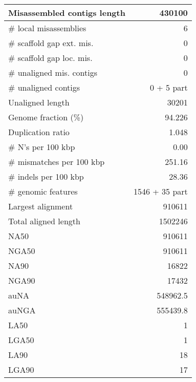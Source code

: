 \documentclass[12pt,a4paper]{article}
\begin{document}
\begin{table}[ht]
\begin{center}
\begin{tabular}{|l*{1}{|r}|}
Misassembled contigs length & 430100 \\ \hline
\# local misassemblies & 6 \\ \hline
\# scaffold gap ext. mis. & 0 \\ \hline
\# scaffold gap loc. mis. & 0 \\ \hline
\# unaligned mis. contigs & 0 \\ \hline
\# unaligned contigs & 0 + 5 part \\ \hline
Unaligned length & 30201 \\ \hline
Genome fraction (\%) & 94.226 \\ \hline
Duplication ratio & 1.048 \\ \hline
\# N's per 100 kbp & 0.00 \\ \hline
\# mismatches per 100 kbp & 251.16 \\ \hline
\# indels per 100 kbp & 28.36 \\ \hline
\# genomic features & 1546 + 35 part \\ \hline
Largest alignment & 910611 \\ \hline
Total aligned length & 1502246 \\ \hline
NA50 & 910611 \\ \hline
NGA50 & 910611 \\ \hline
NA90 & 16822 \\ \hline
NGA90 & 17432 \\ \hline
auNA & 548962.5 \\ \hline
auNGA & 555439.8 \\ \hline
LA50 & 1 \\ \hline
LGA50 & 1 \\ \hline
LA90 & 18 \\ \hline
LGA90 & 17 \\ \hline
\end{tabular}
\end{center}
\end{table}
\end{document}

